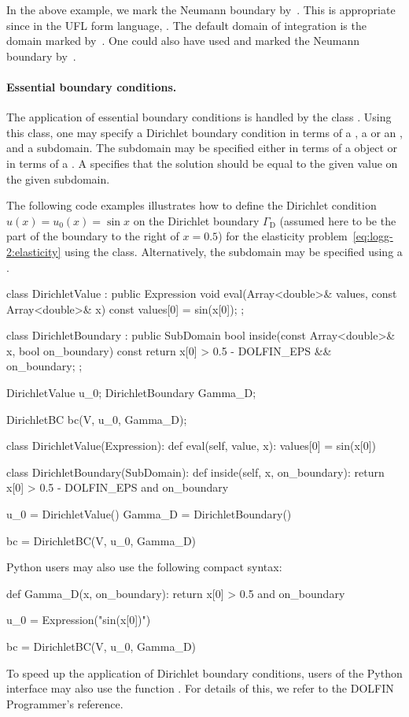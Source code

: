 In the above example, we mark the Neumann boundary by~. This is
appropriate since in the UFL form language, . The default
domain of integration is the domain marked by~. One could also
have used  and marked the Neumann boundary by~.


\paragraph{Essential boundary conditions.}

The application of essential boundary conditions is handled by the
class . Using this class, one may specify a Dirichlet
boundary condition in terms of a , a 
or an , and a subdomain. The subdomain may be
specified either in terms of a  object or in terms of a
. A  specifies that the solution
should be equal to the given value on the given subdomain.

The following code examples illustrates how to define the Dirichlet
condition $u(x) = u_0(x) = \sin x$ on the Dirichlet boundary
$\Gamma_{\mathrm{D}}$ (assumed here to be the part of the boundary
to the right of $x = 0.5$) for the elasticity
problem~\eqref{eq:logg-2:elasticity} using the 
class. Alternatively, the subdomain may be specified using a
.
\begin{c++}
class DirichletValue : public Expression
{
  void eval(Array<double>& values, const Array<double>& x) const
  {
    values[0] = sin(x[0]);
  }
};

class DirichletBoundary : public SubDomain
{
  bool inside(const Array<double>& x, bool on_boundary) const
  {
    return x[0] > 0.5 - DOLFIN_EPS && on_boundary;
  }
};

DirichletValue u_0;
DirichletBoundary Gamma_D;

DirichletBC bc(V, u_0, Gamma_D);
\end{c++}
\begin{python}
class DirichletValue(Expression):
    def eval(self, value, x):
        values[0] = sin(x[0])

class DirichletBoundary(SubDomain):
    def inside(self, x, on_boundary):
        return x[0] > 0.5 - DOLFIN_EPS and on_boundary

u_0 = DirichletValue()
Gamma_D = DirichletBoundary()

bc = DirichletBC(V, u_0, Gamma_D)
\end{python}
Python users may also use the following compact syntax:
\begin{python}
def Gamma_D(x, on_boundary):
    return x[0] > 0.5 and on_boundary

u_0 = Expression("sin(x[0])")

bc = DirichletBC(V, u_0, Gamma_D)
\end{python}
To speed up the application of Dirichlet boundary conditions, users of the
Python interface may also use the function . For
details of this, we refer to the DOLFIN Programmer's reference.

